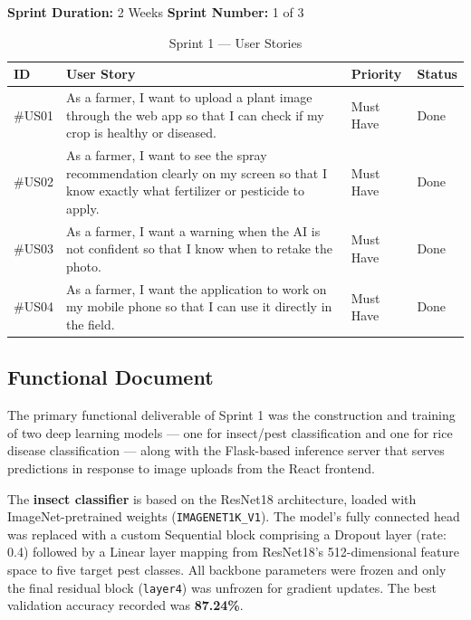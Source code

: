 \documentclass[12pt,a4paper]{report}
\begin{document}
\medskip
\textbf{Sprint Duration:} 2 Weeks \hfill \textbf{Sprint Number:} 1 of 3

\begin{table}[H]
\centering
\caption{Sprint 1 --- User Stories}
\label{tab:sprint1_us}
\renewcommand{\arraystretch}{1.4}
\begin{tabular}{|p{1.4cm}|p{7.8cm}|p{2.4cm}|p{1.8cm}|}
\hline
\textbf{ID} & \textbf{User Story} & \textbf{Priority} & \textbf{Status} \\
\hline
\#US01 & As a farmer, I want to upload a plant image through the web app so that I can check if my crop is healthy or diseased. & Must Have & Done \\
\hline
\#US02 & As a farmer, I want to see the spray recommendation clearly on my screen so that I know exactly what fertilizer or pesticide to apply. & Must Have & Done \\
\hline
\#US03 & As a farmer, I want a warning when the AI is not confident so that I know when to retake the photo. & Must Have & Done \\
\hline
\#US04 & As a farmer, I want the application to work on my mobile phone so that I can use it directly in the field. & Must Have & Done \\
\hline
\end{tabular}
\end{table}

\subsection{Functional Document}

The primary functional deliverable of Sprint 1 was the construction and training of two deep learning models --- one for insect/pest classification and one for rice disease classification --- along with the Flask-based inference server that serves predictions in response to image uploads from the React frontend.

The \textbf{insect classifier} is based on the ResNet18 architecture, loaded with ImageNet-pretrained weights (\texttt{IMAGENET1K\_V1}). The model's fully connected head was replaced with a custom Sequential block comprising a Dropout layer (rate: 0.4) followed by a Linear layer mapping from ResNet18's 512-dimensional feature space to five target pest classes. All backbone parameters were frozen and only the final residual block (\texttt{layer4}) was unfrozen for gradient updates. The best validation accuracy recorded was \textbf{87.24\%}.
\end{document}
